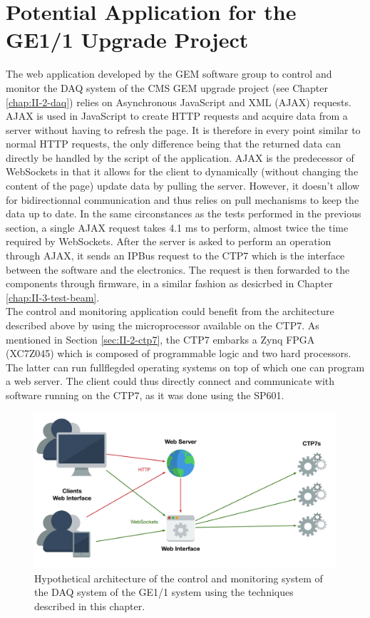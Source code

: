   \section{Potential Application for the GE1/1 Upgrade Project}

    The web application developed by the GEM software group to control and monitor the DAQ system of the CMS GEM upgrade project (see Chapter \ref{chap:II-2-daq}) relies on Asynchronous JavaScript and XML (AJAX) requests. AJAX is used in JavaScript to create HTTP requests and acquire data from a server without having to refresh the page. It is therefore in every point similar to normal HTTP requests, the only difference being that the returned data can directly be handled by the script of the application. AJAX is the predecessor of WebSockets in that it allows for the client to dynamically (without changing the content of the page) update data by pulling the server. However, it doesn't allow for bidirectionnal communication and thus relies on pull mechanisms to keep the data up to date. In the same circonstances as the tests performed in the previous section, a single AJAX request takes 4.1 ms to perform, almost twice the time required by WebSockets. After the server is asked to perform an operation through AJAX, it sends an IPBus request to the CTP7 which is the interface between the software and the electronics. The request is then forwarded to the components through firmware, in a similar fashion as desicrbed in Chapter \ref{chap:II-3-test-beam}. \\

    The control and monitoring application could benefit from the architecture described above by using the microprocessor available on the CTP7. As mentioned in Section \ref{sec:II-2-ctp7}, the CTP7 embarks a Zynq FPGA (XC7Z045) which is composed of programmable logic and two hard processors. The latter can run fullflegded operating systems on top of which one can program a web server. The client could thus directly connect and communicate with software running on the CTP7, as it was done using the SP601. \\

    \begin{figure}[b!]
      \centering
      \includegraphics[width=\textwidth]{img/III-2-web-daq/gem-sys}
      \caption{Hypothetical architecture of the control and monitoring system of the DAQ system of the GE1/1 system using the techniques described in this chapter.}
      \label{fig:III-2-gem}
    \end{figure}

